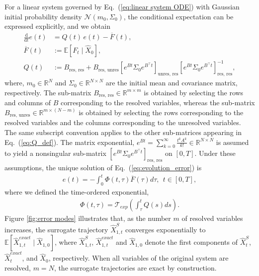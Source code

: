 \documentclass[11pt, a4paper, oneside, reqno]{amsart}
\begin{document}
For a linear system governed by Eq.~(\ref{eq:linear system ODE})
with Gaussian initial probability density $\mathcal{N}(m_0,\Sigma_0)$, the conditional expectation can be expressed explicitly, and we obtain
\begin{align}
    \frac{\mathrm{d}}{\mathrm{d}t} e(t) 
    &= Q(t)\, e(t) - \overline{F}(t), \label{eq:evolution_error} \\
    \overline{F}(t) 
    &:= \mathbb{E} [ F_t \mid \hat{X}_0 ], \label{eq:mean_force} \\
    Q(t) 
    &:= B_{\mathrm{res},\,\mathrm{res}} 
    + B_{\mathrm{res},\,\mathrm{unres}} 
    \left[ e^{Bt} \Sigma_0 e^{B^\top t} \right]_{\mathrm{unres},\,\mathrm{res}} 
    \left[ e^{Bt} \Sigma_0 e^{B^\top t} \right]^{-1}_{\mathrm{res},\,\mathrm{res}}, \label{eq:Q_def}
\end{align}
where, $m_0 \in \mathbb{R}^N$ and $\Sigma_0 \in \mathbb{R}^{N\times N}$ are the initial mean and covariance matrix, respectively.
The sub-matrix $B_{\mathrm{res},\,\mathrm{res}} \in \mathbb{R}^{m \times m}$ is obtained by selecting the rows and columns of $B$ corresponding to the resolved variables, whereas the sub-matrix $B_{\mathrm{res},\,\mathrm{unres}} \in\mathbb{R}^{m\times (N-m)}$ is obtained by selecting the rows corresponding to the resolved variables and the columns corresponding to the unresolved variables. The same subscript convention applies to the other sub-matrices appearing in Eq.~(\ref{eq:Q_def}). The matrix exponential, $e^{Bt}=\sum_{k=0}^\infty \frac{t^kA^k}{k!}\in \mathbb{R}^{N \times N}$ is assumed to yield a nonsingular sub-matrix $\left[ e^{Bt} \Sigma_0 e^{B^\top t} \right]_{\mathrm{res},\,\mathrm{res}}$  on $[0,T]$. Under these assumptions, the unique solution of Eq.~(\ref{eq:evolution_error}) is
\begin{eqnarray}\label{eq:error analytical}
    e(t) = -\int_0^t \Phi(t,\tau) \overline{F}(\tau)  d\tau, \ \ t\in[0,T],
\end{eqnarray}
where we defined the time-ordered exponential,
\begin{eqnarray}
    \Phi(t,\tau) = \mathcal{T}_{exp}\left(  \int_\tau^t Q(s)ds \right).
\end{eqnarray}
Figure \ref{fig:error modes} illustrates that, as the number $m$ of resolved variables increases, the surrogate trajectory $\hat{X}^S_{1,t}$ converges exponentially to $\mathbb{E}[\hat{X}_{1,t}^{exact}\mid\hat{X}_{1,0}]$, where $\hat{X}^S_{1,t}$, $\hat{X}_{1,t}^{exact}$ and $\hat{X}_{1,0}$ denote the first components of $\hat{X}_t^S$, $\hat{X}^{exact}_t$, and $\hat{X}_0$, respectively. 
When all variables of the original system are resolved, $m=N$, the surrogate trajectories are exact by construction.
\end{document}
